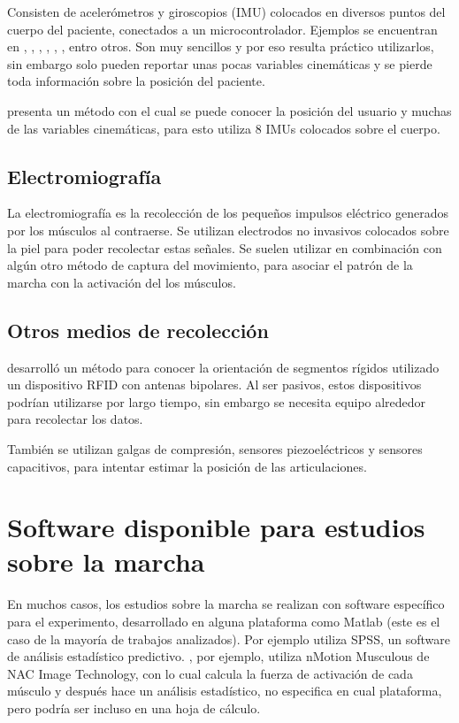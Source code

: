 Consisten de acelerómetros y giroscopios (IMU) colocados en diversos puntos del cuerpo del paciente, conectados a un microcontrolador. Ejemplos se encuentran en \cite{menz}, \cite{arif}, \cite{senanayake}, \cite{latt}, \cite{mazza}, \cite{hu}, entro otros. Son muy sencillos y por eso resulta práctico utilizarlos, sin embargo solo pueden reportar unas pocas variables cinemáticas y se pierde toda información sobre la posición del paciente.

\cite{yuan} presenta un método con el cual se puede conocer la posición del usuario y muchas de las variables cinemáticas, para esto utiliza 8 IMUs colocados sobre el cuerpo.

\subsection{Electromiografía}

La electromiografía es la recolección de los pequeños impulsos eléctrico generados por los músculos al contraerse. Se utilizan electrodos no invasivos colocados sobre la piel para poder recolectar estas señales. Se suelen utilizar en combinación con algún otro método de captura del movimiento, para asociar el patrón de la marcha con la activación del los músculos. \cite{muro}

\subsection{Otros medios de recolección}

\cite{krigslund} desarrolló un método para conocer la orientación de segmentos rígidos utilizado un dispositivo RFID con antenas bipolares. Al ser pasivos, estos dispositivos podrían utilizarse por largo tiempo, sin embargo se necesita equipo alrededor para recolectar los datos. 

También se utilizan galgas de compresión, sensores piezoeléctricos y sensores capacitivos, para intentar estimar la posición de las articulaciones. \citep{muro}


\section[Software disponible]{Software disponible para estudios sobre la marcha}

En muchos casos, los estudios sobre la marcha se realizan con software específico para el experimento, desarrollado en alguna plataforma como Matlab (este es el caso de la mayoría de trabajos analizados). Por ejemplo \cite{menz} utiliza SPSS, un software de análisis estadístico predictivo. \cite{mizoguchi}, por ejemplo, utiliza nMotion Musculous de NAC Image Technology, con lo cual calcula la fuerza de activación de cada músculo y después hace un análisis estadístico, no especifica en cual plataforma, pero podría ser incluso en una hoja de cálculo. 


